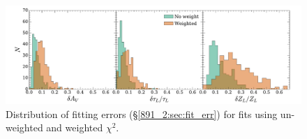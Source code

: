 
\begin{figure}[t]
  \centering
  \includegraphics[width=\textwidth]{891_2/figs/weight_comp_hist.pdf}
  \caption[Comparison of uncertainties between weighted and un-weighted
    fits]{\fixspacing\label{891_2:fig:weight_comp}
    Distribution of fitting errors (\S\ref{891_2:sec:fit_err}) for fits
    using un-weighted and weighted $\chi^2$.}
\end{figure}




